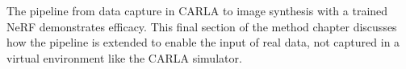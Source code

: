 \begin{comment}
Introduction
- Making NeRFs with real data is the usual way to go about generating NeRFs.
- The challenge is in capturing this data from cameras mounted on vehicles, in uncontrolled environment.

How do I expand the pipeline?
- How is the data captured? Introduce the NAPLab-car, the sensors, etc.
- How do I read this data? Mention the Aksel and Mathias' repository.
    - Use FFMPEG to read the .h264-video and serve the frames with a generator-function.
    - Use regex to parse a file with GPS data formatted as NMEA (National Marine Electronics Association) sentences, a standard messages used by GPS (Global Positioning System) receivers to communicate with other devices, such as computers or chartplotters. Each GPS-datapoint is seved with a generator-function the same way as with the video-frames.
    - The camera is synchronized to the closest frame in time to the GPS timestamp using custom code. "- Custom code is used to synchronize the camera to the frame closest in time with the GPS timestamp."
    - After synchronization, I can loop through the synchronized sensor data with a regular loop.
- Premise: Have synchronized image- and GPS-data.
- Create a NAPLabDataParser that implements the same methods as the CarlaDataParser. The main difference is in the implementation of the transform-function. 
- The transformation matrix is created by :
    - Store the initial GPS lat, long and alt, and use it as the reference point.
    - The reference point is utilized in order to convert latitude, longitude, altitude of subsequent GPS-readings to North, East, Down from the observer, i.e. the reference point.
    - NED is then converted to ENU and then to blender coordinate conventions.
    - The rotation is estimated with trigonometry by comparing subsequent GPS-readings.
    - The translation and rotation is combined into a transformation matrix.
- The intrinsics are computed in the same way as discussed in \autoref{sec:carla-to-nerfstudio}.
- The transformation matrix and intrinsics are combined into a transform.json
- The exported transform.json and images are in the same format as the output from the CarlaDataParser, so the following pipeline remains unchanged.
\end{comment}

The pipeline from data capture in CARLA to image synthesis with a trained NeRF demonstrates efficacy. This final section of the method chapter discusses how the pipeline is extended to enable the input of real data, not captured in a virtual environment like the CARLA simulator.

